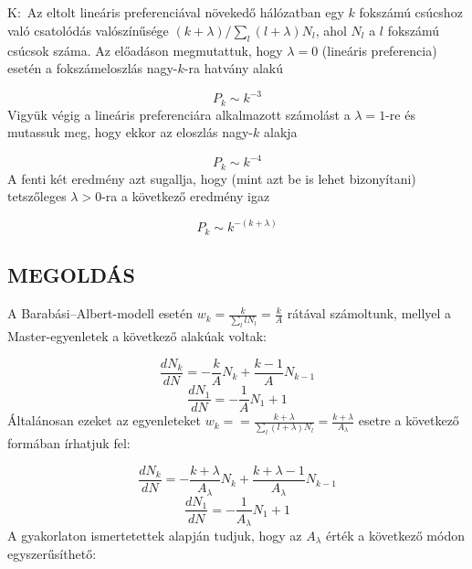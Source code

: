 \section{} \label{sec:1}
K:\ Az eltolt lineáris preferenciával növekedő hálózatban egy $k$ fokszámú csúcshoz való csatolódás valószínűsége $(k + \lambda)/\sum_{l} \left( l + \lambda \right) N_{l}$, ahol $N_{l}$ a $l$ fokszámú csúcsok száma. Az előadáson megmutattuk, hogy $\lambda = 0$ (lineáris preferencia) esetén a fokszámeloszlás nagy-$k$-ra hatvány alakú

\begin{equation*}
    P_{k} \sim k^{-3}
\end{equation*}
Vigyük végig a lineáris preferenciára alkalmazott számolást a $\lambda = 1$-re és mutassuk meg, hogy ekkor az eloszlás nagy-$k$ alakja

\begin{equation*}
    P_{k} \sim k^{-4}
\end{equation*}
A fenti két eredmény azt sugallja, hogy (mint azt be is lehet bizonyítani) tetszőleges $\lambda > 0$-ra a következő eredmény igaz

\begin{equation*}
    P_{k} \sim k^{-\left(k + \lambda \right)}
\end{equation*}

\subsection*{\bfseries\normalsize\MakeUppercase{Megoldás}}
A Barabási--Albert-modell esetén $w_{k} = \frac{k}{\sum_{l} l N_{l}} = \frac{k}{A}$ rátával számoltunk, mellyel a Master-egyenletek a következő alakúak voltak:

\begin{equation} \label{eq:1}
    \frac{d N_{k}}{dN}
    =
    -\frac{k}{A} N_{k} + \frac{k - 1}{A} N_{k-1}
\end{equation}
\begin{equation} \label{eq:2}
    \frac{d N_{1}}{dN}
    =
    -\frac{1}{A} N_{1} + 1
\end{equation}
Általánosan ezeket az egyenleteket $w_{k} = = \frac{k + \lambda}{\sum_{l} \left( l + \lambda \right) N_{l}} = \frac{k + \lambda}{A_{\lambda}}$ esetre a következő formában írhatjuk fel:

\begin{equation} \label{eq:3}
    \frac{d N_{k}}{dN}
    =
    -\frac{k + \lambda}{A_{\lambda}} N_{k} + \frac{k + \lambda - 1}{A_{\lambda}} N_{k-1}
\end{equation}
\begin{equation} \label{eq:4}
    \frac{d N_{1}}{dN}
    =
    -\frac{1}{A_{\lambda}} N_{1} + 1
\end{equation}
A gyakorlaton ismertetettek alapján tudjuk, hogy az $A_{\lambda}$ érték a következő módon egyszerűsíthető:

